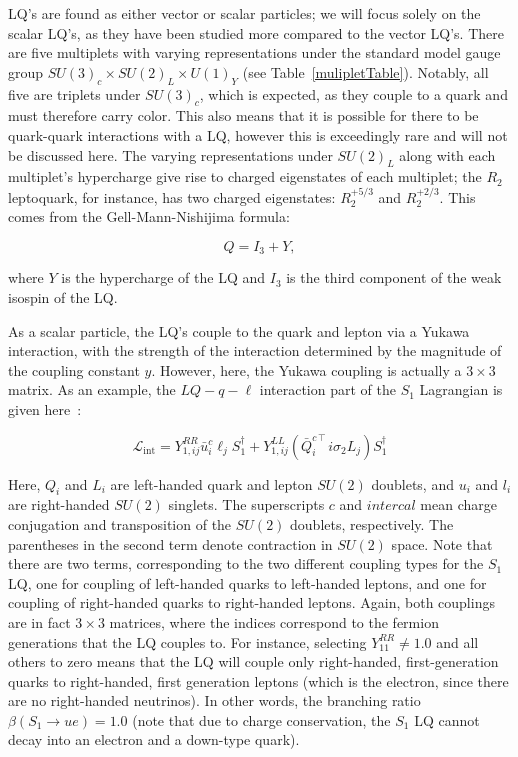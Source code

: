         LQ's are found as either vector or scalar particles; we will focus solely on the scalar LQ's, as they have been studied more compared to the vector LQ's. There are five multiplets with varying representations under the standard model gauge group $SU(3)_c \times SU(2)_L \times U(1)_Y$ (see Table~\ref{mulipletTable}). Notably, all five are triplets under $SU(3)_c$, which is expected, as they couple to a quark and must therefore carry color. This also means that it is possible for there to be quark-quark interactions with a LQ, however this is exceedingly rare and will not be discussed here. The varying representations under $SU(2)_L$ along with each multiplet's hypercharge give rise to charged eigenstates of each multiplet; the $R_2$ leptoquark, for instance, has two charged eigenstates: $R_2^{+5/3}$ and $R_2^{+2/3}$. This comes from the Gell-Mann-Nishijima formula:

        \begin{equation}
            Q = I_3 + Y,
        \end{equation}

        where $Y$ is the hypercharge of the LQ and $I_3$ is the third component of the weak isospin of the LQ.

        As a scalar particle, the LQ's couple to the quark and lepton via a Yukawa interaction, with the strength of the interaction determined by the magnitude of the coupling constant $y$. However, here, the Yukawa coupling is actually a $3\times3$ matrix. As an example, the $LQ-q-\ell$ interaction part of the $S_1$ Lagrangian is given here~\cite{Crivellin_2022}:

        \begin{equation}
            \mathcal{L}_{\text{int}} = Y_{1,ij}^{RR} \bar{u}_i^c \ell_j S_1^{\dagger} + Y_{1,ij}^{LL} \left(\bar{Q}_i^{c\intercal} i\sigma_2 L_j \right) S_1^{\dagger}
        \end{equation}

        Here, $Q_i$ and $L_i$ are left-handed quark and lepton $SU(2)$ doublets, and $u_i$ and $l_i$ are right-handed $SU(2)$ singlets. The superscripts $c$ and $intercal$ mean charge conjugation and transposition of the $SU(2)$ doublets, respectively. The parentheses in the second term denote contraction in $SU(2)$ space. Note that there are two terms, corresponding to the two different coupling types for the $S_1$ LQ, one for coupling of left-handed quarks to left-handed leptons, and one for coupling of right-handed quarks to right-handed leptons. Again, both couplings are in fact $3\times3$ matrices, where the indices correspond to the fermion generations that the LQ couples to. For instance, selecting $Y^{RR}_{11} \neq 1.0$ and all others to zero means that the LQ will couple only right-handed, first-generation quarks to right-handed, first generation leptons (which is the electron, since there are no right-handed neutrinos). In other words, the branching ratio $\beta(S_1 \rightarrow ue)=1.0$ (note that due to charge conservation, the $S_1$ LQ cannot decay into an electron and a down-type quark).


